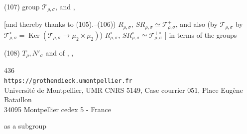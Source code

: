 \noindent(107) group $\mathcal{T}_{\rho,\sigma}$, and 
,

[and thereby thanks to (105).--(106)) $R_{\rho,\sigma}$,
$SR_{\rho,\sigma}\simeq\mathcal{T}_{\rho,\sigma}^{+}$, and also
(by 
$\mathcal{T}_{\rho,\sigma}$ by
$\mathcal{T}_{\rho,\sigma}^{\circ}=\operatorname{Ker}
(\mathcal{T}_{\rho,\sigma}\longrightarrow\mu_2\times\mu_2)$)
$R_{\rho,\sigma}^{\circ}$,
$SR_{\rho,\sigma}^{\circ}\simeq\mathcal{T}_{\rho,\sigma}^{+\circ}$
\unsure{$\Rightarrow$}]
in terms of the groups

\begin{samepage}
\noindent(108) $T_\rho,N'_\sigma$ and of
,
,
\end{samepage}


\begin{center}
{\small
436\\
\texttt{https://grothendieck.umontpellier.fr}\\
Université de Montpellier, UMR CNRS 5149, Case courrier 051, Place Eugène Bataillon\\
34095 Montpellier cedex 5 - France
}
\end{center}


as a subgroup

